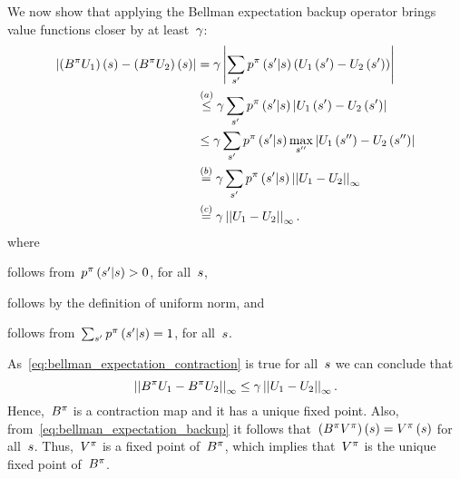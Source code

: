 We now show that applying the Bellman expectation backup operator brings value functions closer by at least~${\gamma}$:
\begin{align} \label{eq:bellman_expectation_contraction}
    \left\lvert\left(\bellmanoperator\policyscript\valuevector_{1}\right)\left(\state\right)-\left(\bellmanoperator\policyscript\valuevector_{2}\right)\left(\state\right)\right\rvert
    	&=\discount\left\lvert\sum_{\state'}\transition\policyscript\left(\state'\middle\vert\state\right)\left(\valuevector_{1}\left(\state'\right)-\valuevector_{2}\left(\state'\right)\right)\right\rvert \notag \\
    	&\overset{(a)}{\leq}\discount\sum_{\state'}\transition\policyscript\left(\state'\middle\vert\state\right)\left\vert\valuevector_{1}\left(\state'\right)-\valuevector_{2}\left(\state'\right)\right\rvert \notag \\
    	&\leq\discount\sum_{\state'}\transition\policyscript\left(\state'\middle\vert\state\right)\max_{\state''}\left\lvert\valuevector_{1}\left(\state''\right)-\valuevector_{2}\left(\state''\right)\right\rvert \notag \\
    	&\overset{(b)}{=}\discount\sum_{\state'}\transition\policyscript\left(\state'\middle\vert\state\right)\left\lvert\left\lvert\valuevector_{1}-\valuevector_{2}\right\rvert\right\rvert_{\infty} \notag \\
    	&\overset{(c)}{=}\discount\left\lvert\left\lvert\valuevector_{1}-\valuevector_{2}\right\rvert\right\rvert_{\infty}.
\end{align}
where
\begin{enumerate*}[label=(\alph*)]
	\item follows from~${\transition\policyscript\left(\state'\middle\vert\state\right)>0}$, for all~${\state}$,
	\item follows by the definition of uniform norm, and
	\item follows from~${\sum_{\state'}\transition\policyscript\left(\state'\middle\vert\state\right)=1}$, for all~${\state}$.
\end{enumerate*}

As~\eqref{eq:bellman_expectation_contraction} is true for all~${\state}$ we can conclude that
\begin{equation}
	\left\lvert\left\lvert B^{\pi}U_{1}-B^{\pi}U_{2}\right\rvert\right\rvert_{\infty}\leq\gamma\left\lvert\left\lvert U_{1}-U_{2}\right\rvert\right\rvert_{\infty}.
\end{equation}
Hence,~${B^{\pi}}$ is a contraction map and it has a unique fixed point. Also, from~\eqref{eq:bellman_expectation_backup} it follows that~${\left(\bellmanoperator\policyscript\statevalue\policyscript\right)\left(\state\right)=\statevalue\policyscript\left(s\right)}$ for all~${\state}$. Thus,~${V^{\pi}}$ is a fixed point of~${B^{\pi}}$, which implies that~${V^{\pi}}$ is the unique fixed point of~${B^{\pi}}$.

